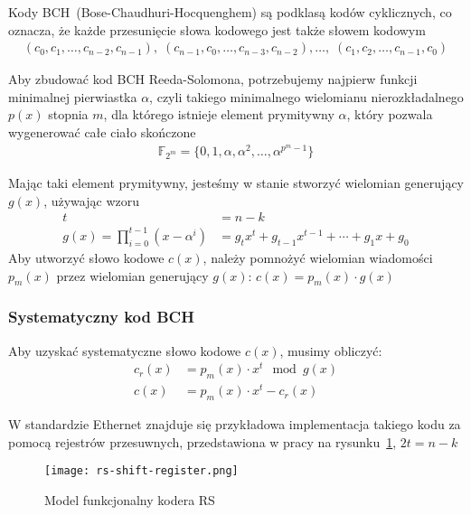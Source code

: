 Kody BCH~(Bose-Chaudhuri-Hocquenghem) są podklasą kodów cyklicznych, co oznacza, że każde przesunięcie słowa kodowego jest także słowem kodowym
\begin{align*}
    (c_0, c_1,\ldots, c_{n-2}, c_{n-1}), \;
    (c_{n-1}, c_0, \ldots, c_{n-3}, c_{n-2}),\ldots, \;
    (c_1, c_2, \ldots, c_{n-1}, c_{0})
\end{align*}

Aby zbudować kod BCH Reeda-Solomona, potrzebujemy najpierw funkcji minimalnej pierwiastka $\alpha$, czyli takiego minimalnego wielomianu nierozkładalnego $p(x)$ stopnia $m$, dla którego istnieje element prymitywny $\alpha$, który pozwala wygenerować całe ciało skończone
\begin{align*}
    \mathbb{F}_{2^m} = \{0, 1, \alpha, \alpha^2, \ldots, \alpha^{p^{m}-1} \}
\end{align*}

Mając taki element prymitywny, jesteśmy w stanie stworzyć wielomian generujący $g(x)$, używając wzoru
\begin{align*}
    t &= n - k \\
    g(x) = \prod_{i=0}^{t-1} (x - \alpha^i) &= g_{t}x^t + g_{t-1}x^{t-1} +
    \cdots + g_{1}x + g_{0}
\end{align*}
Aby utworzyć słowo kodowe $c(x)$, należy pomnożyć wielomian wiadomości $p_m(x)$ przez wielomian generujący $g(x)$: $c(x) = p_{m}(x) \cdot g(x)$

\subsubsection{Systematyczny kod BCH}

Aby uzyskać systematyczne słowo kodowe $c(x)$, musimy obliczyć:
\begin{align*}
    c_r(x) &= p_m(x) \cdot x^t \mod g(x) \\
    c(x) &= p_m(x) \cdot x^t - c_r(x)
\end{align*}

W standardzie Ethernet znajduje się przykładowa implementacja takiego kodu za pomocą rejestrów przesuwnych, przedstawiona w pracy na rysunku~\ref{model-funkcjonalny}, $2t=n-k$
\begin{figure}[H]
    \texttt{[image: rs-shift-register.png]}
    \caption{Model funkcjonalny kodera RS~\cite[sekcja 91.5.2.7]{Ethernet}}\label{model-funkcjonalny}
\end{figure}
